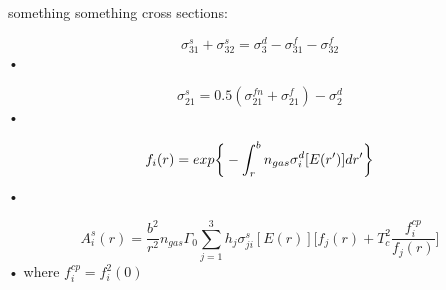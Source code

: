 \documentclass[a3]{book}
\begin{document}
something something cross sections:

\begin{equation}
	\sigma^{s}_{31} + \sigma^{s}_{32} = \sigma^{d}_{3} - \sigma^{f}_{31} - \sigma^{f}_{32}
\end{equation}•

\begin{equation}
	\sigma^{s}_{21} = 0.5 (\sigma^{fn}_{21} + \sigma^{f}_{21} ) - \sigma^{d}_{2}
\end{equation}•


\begin{equation}
f_i(r) = exp \bigg\{ -\int_r^{b} n_{gas} \sigma^{d}_{i}[E(r')]dr' \bigg\} \\
\end{equation}•

\begin{equation}
A^{s}_{i}(r) = \frac{b^2}{r^2} n_{gas} \Gamma_0 \sum_{j=1}^3 h_j \sigma_{ji}^s[E(r)] \bigg[ f_j(r) + T_c^2 \frac{ f_{i}^{cp} }{f_j(r)} \bigg]
\end{equation}•
where $f_i^{cp} = f_i^2(0)$
\end{document}
